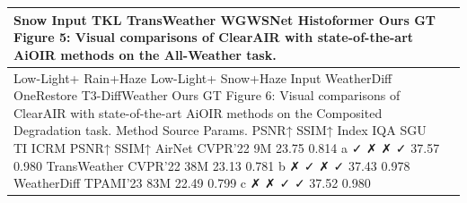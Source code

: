 \begin{tabular}{ll}
\toprule
Snow Input TKL TransWeather WGWSNet Histoformer Ours GT Figure 5: Visual comparisons of ClearAIR with state-of-the-art AiOIR methods on the All-Weather task. &  \\
\midrule
Low-Light+ Rain+Haze Low-Light+ Snow+Haze Input WeatherDiff OneRestore T3-DiffWeather Ours GT Figure 6: Visual comparisons of ClearAIR with state-of-the-art AiOIR methods on the Composited Degradation task. Method Source Params. PSNR↑ SSIM↑ Index IQA SGU TI ICRM PSNR↑ SSIM↑ AirNet CVPR’22 9M 23.75 0.814 a ✓ ✗ ✗ ✓ 37.57 0.980 TransWeather CVPR’22 38M 23.13 0.781 b ✗ ✓ ✗ ✓ 37.43 0.978 WeatherDiff TPAMI’23 83M 22.49 0.799 c ✗ ✗ ✓ ✓ 37.52 0.980 &  \\
\bottomrule
\end{tabular}
